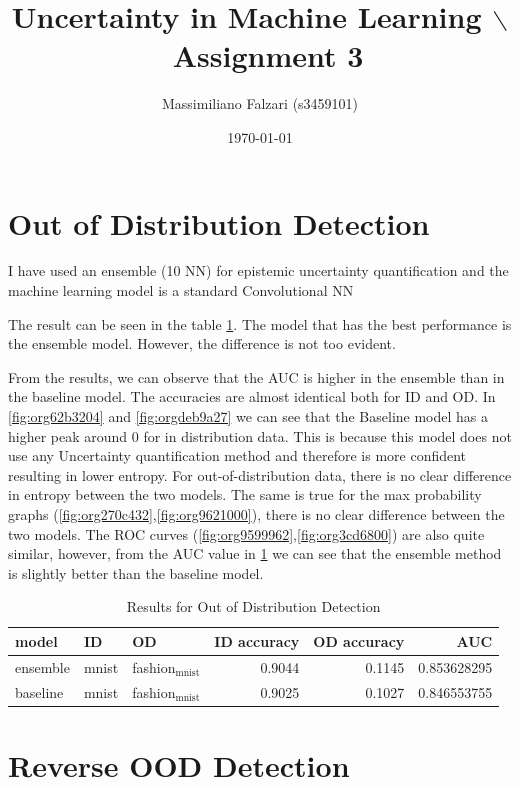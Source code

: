 \documentclass[11pt]{article}
\author{Massimiliano Falzari (s3459101)}
\date{\today}
\title{Uncertainty in Machine Learning $\backslash$\ Assignment 3}
\begin{document}
\maketitle
\tableofcontents


\section{Out of Distribution Detection}
\label{sec:orgbbd923c}

I have used an ensemble (10 NN) for epistemic uncertainty quantification and
the machine learning model is a standard Convolutional NN

The result can be seen in the table \ref{tab:org9d93816}.
The model that has the best performance is the ensemble
model. However, the difference is not too evident.

From the results, we can observe that the AUC is higher in the
ensemble than in the baseline model. The accuracies are almost identical
both for ID and OD.
In \ref{fig:org62b3204} and \ref{fig:orgdeb9a27} we can see that the
Baseline model has a higher peak around 0 for in distribution data.
This is because this model does not use any Uncertainty quantification
method and therefore is more confident resulting in lower entropy.
For out-of-distribution data, there is no clear difference in entropy between the
two models. The same is true for the max probability graphs
(\ref{fig:org270c432},\ref{fig:org9621000}), there is no clear difference
between the two models.
The ROC curves (\ref{fig:org9599962},\ref{fig:org3cd6800}) are also quite similar,
however, from the AUC value in \ref{tab:org9d93816} we can see that the ensemble method
is slightly better than the baseline model.

\begin{table}[htbp]
\caption{\label{tab:org9d93816}
Results for Out of Distribution Detection}
\centering
\begin{tabular}{lllrrr}
\hline
model & ID & OD & ID accuracy & OD accuracy & AUC\\
\hline
ensemble & mnist & fashion\(_{\text{mnist}}\) & 0.9044 & 0.1145 & 0.853628295\\
\hline
baseline & mnist & fashion\(_{\text{mnist}}\) & 0.9025 & 0.1027 & 0.846553755\\
\hline
\end{tabular}
\end{table}


\section{Reverse OOD Detection}
\label{sec:org44db352}
\end{document}
